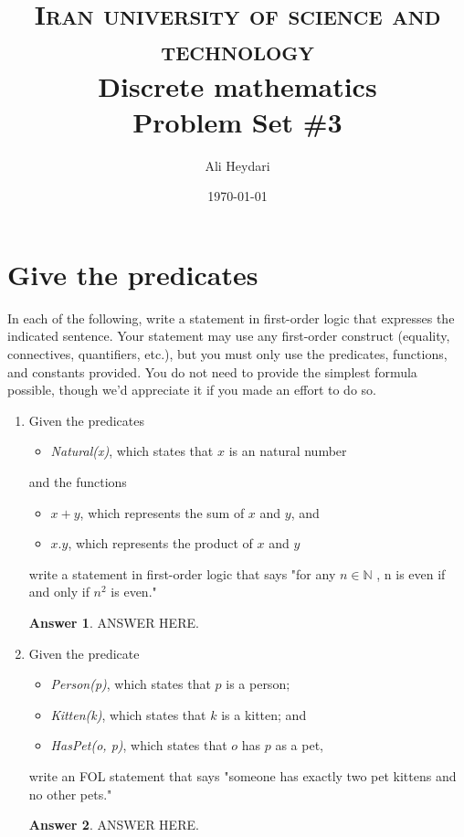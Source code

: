\documentclass[a4paper]{article}
\title{
\textsc{Iran university of science and technology} \\ [25pt] %
Discrete mathematics\\Problem Set \#3 \\
}
\author{Ali Heydari}
\date{\today}
\renewcommand{\(}{\left(}
\renewcommand{\)}{\right)}
\theoremstyle{plain}
\theoremstyle{plain}
\theoremstyle{definition}
\newtheorem*{answer}{Answer}
\begin{document}
\maketitle

\section{Give the predicates}
In each of the following, write a statement in first-order logic that expresses the indicated sentence. Your statement may use any first-order construct (equality, connectives, quantifiers, etc.), but you must only use the predicates, functions, and constants provided. You do not need to provide the simplest formula possible, though we'd appreciate it if you made an effort to do so.
\begin{enumerate}[label*=\roman*.,ref=\roman*]

\item Given the predicates
\begin{itemize}
\item[] \textit{Natural(x)}, which states that $x$ is an natural number
\end{itemize}
and the functions
\begin{itemize}
\item[] $x + y$, which represents the sum of $x$ and $y$, and
\item[] $x . y $, which represents the product of $x$ and $y$
\end{itemize}

write a statement in first-order logic that says "for any $n \in \mathds{N} $ , n is even if and only if $n^2$ is even."
\begin{shaded}
\begin{answer}
ANSWER HERE.
\end{answer}
\end{shaded}

\item Given the predicate
\begin{itemize}
  \item[] \textit{Person(p)}, which states that $p$ is a person;
  \item[] \textit{Kitten(k)}, which states that $k$ is a kitten; and
  \item[] \textit{HasPet(o, p)}, which states that $o$ has $p$ as a pet, 
\end{itemize}
write an FOL statement that says "someone has exactly two pet kittens and no other pets."
\begin{shaded}
\begin{answer}
ANSWER HERE.
\end{answer}
\end{shaded}


\end{enumerate}
\end{document}
